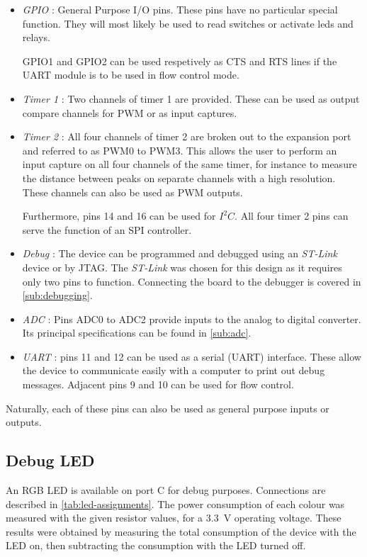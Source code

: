 \begin{itemize}
  \item \emph{GPIO} : General Purpose I/O pins. These pins have no particular
    special function. They will most likely be used to read switches or activate
    leds and relays.
    
    GPIO1 and GPIO2 can be used respetively as CTS and RTS lines if the UART
    module is to be used in flow control mode.
  \item \emph{Timer 1} : Two channels of timer 1 are provided. These can be used
    as output compare channels for \ac{PWM} or as input captures.
  \item \emph{Timer 2} : All four channels of timer 2 are broken out to the
    expansion port and referred to as PWM0 to PWM3.  This allows the user to
    perform an input capture on all four channels of the same timer, for
    instance to measure the distance between peaks on separate channels with
    a high resolution. These channels can also be used as \ac{PWM} outputs.

    Furthermore, pins 14 and 16 can be used for $I^{2}C$. All four timer 2 pins
    can serve the function of an SPI controller.
  \item \emph{Debug} : The device can be programmed and debugged using an
    \emph{ST-Link} device or by JTAG. The \emph{ST-Link} was chosen for this
    design as it requires only two pins to function. Connecting the board to the
    debugger is covered in \autoref{sub:debugging}.
  \item \emph{ADC} : Pins ADC0 to ADC2 provide inputs to the analog to digital
    converter. Its principal specifications can be found in \autoref{sub:adc}.
  \item \emph{UART} : pins 11 and 12 can be used as a serial (UART) interface.
    These allow the device to communicate easily with a computer to print out
    debug messages. Adjacent pins 9 and 10 can be used for flow control.
\end{itemize}

Naturally, each of these pins can also be used as general purpose inputs or
outputs.

\subsection{Debug LED}

An RGB LED is available on port C for debug purposes. Connections are described
in \autoref{tab:led-assignments}. The power consumption of each colour was
measured with the given resistor values, for a \SI{3.3}{V} operating voltage.
These results were obtained by measuring the total consumption of the device
with the LED on, then subtracting the consumption with the LED turned off.

